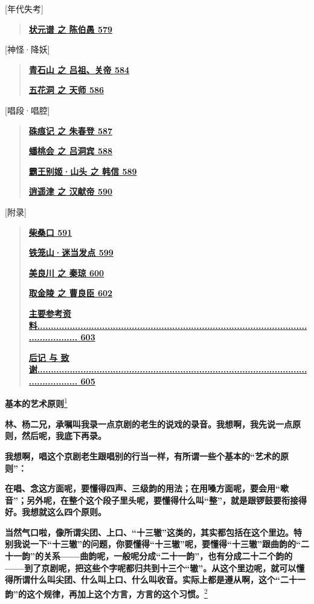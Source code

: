 {[}年代失考{]}

\begin{quote}
\href{/l}{\textbf{状元谱 之 陈伯愚 579}}
\end{quote}

{[}神怪·降妖{]}

\begin{quote}
\href{/l}{\textbf{青石山 之 吕祖、关帝 584}}

\href{/l}{\textbf{五花洞 之 天师 586}}
\end{quote}

{[}唱段·唱腔{]}

\begin{quote}
\href{/l}{\textbf{硃痕记 之 朱春登 587}}

\href{/l}{\textbf{蟠桃会 之 吕洞宾 588}}

\href{/l}{\textbf{霸王别姬·山头 之 韩信 589}}

\href{/l}{\textbf{逍遥津 之 汉献帝 590}}
\end{quote}

{[}附录{]}

\begin{quote}
\href{/l}{\textbf{柴桑口 591}}

\href{/l}{\textbf{铁笼山·迷当发点 599}}

\href{/l}{\textbf{美良川 之 秦琼 600}}

\href{/l}{\textbf{取金陵 之 曹良臣 602}}

\href{/l}{\textbf{主要参考资料......................................................................................................................
603}}

\href{/l}{\textbf{后记 与
致谢......................................................................................................................
605}}
\end{quote}

\textbf{基本的艺术原则}\protect\hyperlink{fn1}{\textsuperscript{1}}

\textbf{林、杨二兄，承嘱叫我录一点京剧的老生的说戏的录音。我想啊，我先说一点原则，然后呢，我底下再录。}

\textbf{我想啊，唱这个京剧老生跟唱别的行当一样，有所谓一些个基本的``艺术的原则''：}

\textbf{在唱、念这方面呢，要懂得四声、三级韵的用法；在用嗓方面呢，要会用``嗽音''；另外呢，在整个这个段子里头呢，要懂得什么叫``整''，就是跟锣鼓要衔接得好。我想就这么四个原则。}

\textbf{当然气口啦，像所谓尖团、上口、``十三辙''这类的，其实都包括在这个里边。特别我说一下``十三辙''的问题，你要懂得``十三辙''呢，要懂得``十三辙''跟曲韵的``二十一韵''的关系------曲韵呢，一般呢分成``二十一韵''，也有分成二十二个韵的------到了京剧呢，把这些个字呢都归共到十三个``辙''。从这个里边呢，就可以懂得所谓什么叫尖团、什么叫上口、什么叫收音。实际上都是遵从啊，这个``二十一韵''的这个规律，再加上这个方言，方言的这个习惯。}\protect\hyperlink{fn2}{\textsuperscript{2}}

